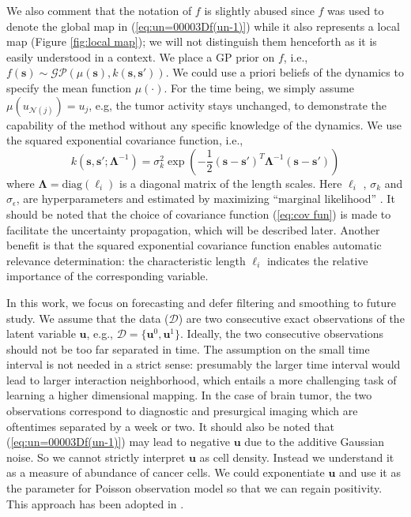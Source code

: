 \documentclass[smallextended,natbib]{svjour3}       %
\begin{document}
We also comment that the notation of $f$ is slightly abused since $f$ was used to denote the global map in (\ref{eq:un=00003Df(un-1)}) while it also represents a local map (Figure \ref{fig:local map}); we will not distinguish them henceforth as it is easily understood in a context. We place a GP prior on $f$, i.e., $f(\mathbf{s})\sim\mathcal{GP}(\mu(\mathbf{s}),k(\mathbf{s},\mathbf{s}'))$. We could use a priori beliefs of the dynamics to specify the mean function $\mu(\cdot)$. For the time being, we simply assume $\mu(u_{\mathcal{N}(j)})=u_{j}$, e.g, the tumor activity stays unchanged, to demonstrate the capability of the method without any specific knowledge of the dynamics. We use the squared exponential covariance function, i.e., 
\begin{equation}
k(\mathbf{s},\mathbf{s}';\boldsymbol{\Lambda}^{-1})=\sigma_{k}^{2}\exp(-\frac{1}{2}(\mathbf{s-s}')^{T}\boldsymbol{\Lambda}^{-1}(\mathbf{s-s}')) \label{eq:cov fun}
\end{equation}
 where $\boldsymbol{\Lambda}=\text{diag}(\ell_{i})$ is a diagonal matrix of the length scales. Here $\ell_{i}$ , $\sigma_{k}$ and  $\sigma_{\epsilon}$, are hyperparameters and estimated by maximizing ``marginal likelihood'' \citep{Rasmussen2006}. It should be noted that the choice of covariance function (\ref{eq:cov fun}) is made to facilitate the uncertainty propagation, which will be described later. Another benefit is that the squared exponential covariance function enables automatic relevance determination: the characteristic length $\ell_{i}$ indicates the relative importance of the corresponding variable. 
 
In this work, we focus on forecasting and defer filtering and smoothing to future study. We assume that the data ($\mathcal{D}$) are two consecutive exact observations of the latent variable $\mathbf{u}$, e.g., $\mathcal{D}=\{\mathbf{u}^{0},\mathbf{u}^{1}\}$.  Ideally, the two consecutive observations should not be too far separated in time.  The assumption on the small time interval is not needed in a strict sense: presumably the larger time interval would lead to larger interaction neighborhood, which entails a more challenging task of learning a higher dimensional mapping. In the case of brain tumor, the two observations  correspond to diagnostic and presurgical imaging which are oftentimes separated by a week or two.  It should also be noted that (\ref{eq:un=00003Df(un-1)}) may lead to negative $\mathbf{u}$ due to the additive Gaussian noise. So we cannot strictly interpret $\mathbf{u}$ as cell density. Instead we understand it as a measure of abundance of cancer cells. We could exponentiate $\mathbf{u}$ and use it as the parameter for Poisson observation model so that we can regain positivity. This approach has been adopted in \citep{Hooten2008}.
\end{document}
